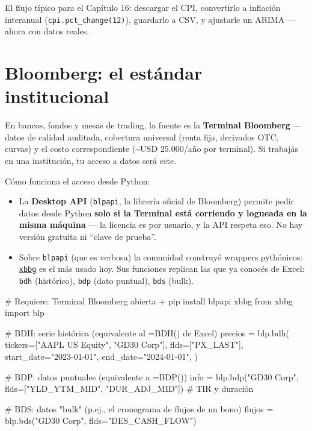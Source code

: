 \documentclass[
  spanish,
  letterpaper,
  DIV=11,
  numbers=noendperiod]{scrreprt}
\newenvironment{Shaded}{\begin{snugshade}}{\end{snugshade}}
\newcommand{\CommentTok}[1]{\textcolor[rgb]{0.37,0.37,0.37}{#1}}
\newcommand{\ImportTok}[1]{\textcolor[rgb]{0.00,0.46,0.62}{#1}}
\newcommand{\NormalTok}[1]{\textcolor[rgb]{0.00,0.23,0.31}{#1}}
\newcommand{\OperatorTok}[1]{\textcolor[rgb]{0.37,0.37,0.37}{#1}}
\newcommand{\StringTok}[1]{\textcolor[rgb]{0.13,0.47,0.30}{#1}}
\providecommand{\tightlist}{%
  \setlength{\itemsep}{0pt}\setlength{\parskip}{0pt}}
\begin{document}
El flujo típico para el Capítulo 16: descargar el CPI, convertirlo a
inflación interanual (\texttt{cpi.pct\_change(12)}), guardarlo a CSV, y
ajustarle un ARIMA --- ahora con datos reales.

\section{Bloomberg: el estándar
institucional}\label{bloomberg-el-estuxe1ndar-institucional}

En bancos, fondos y mesas de trading, la fuente es la \textbf{Terminal
Bloomberg} --- datos de calidad auditada, cobertura universal (renta
fija, derivados OTC, curvas) y el costo correspondiente
(\textasciitilde USD 25.000/año por terminal). Si trabajás en una
institución, tu acceso a datos será este.

Cómo funciona el acceso desde Python:

\begin{itemize}
\tightlist
\item
  La \textbf{Desktop API} (\texttt{blpapi}, la librería oficial de
  Bloomberg) permite pedir datos desde Python \textbf{solo si la
  Terminal está corriendo y logueada en la misma máquina} --- la
  licencia es por usuario, y la API respeta eso. No hay versión gratuita
  ni ``clave de prueba''.
\item
  Sobre \texttt{blpapi} (que es verbosa) la comunidad construyó wrappers
  pythónicos: \href{https://github.com/alpha-xone/xbbg}{\texttt{xbbg}}
  es el más usado hoy. Sus funciones replican las que ya conocés de
  Excel: \texttt{bdh} (histórico), \texttt{bdp} (dato puntual),
  \texttt{bds} (bulk).
\end{itemize}

\begin{Shaded}
\begin{Highlighting}[]
\CommentTok{\# Requiere: Terminal Bloomberg abierta + pip install blpapi xbbg}
\ImportTok{from}\NormalTok{ xbbg }\ImportTok{import}\NormalTok{ blp}

\CommentTok{\# BDH: serie histórica (equivalente al =BDH() de Excel)}
\NormalTok{precios }\OperatorTok{=}\NormalTok{ blp.bdh(}
\NormalTok{    tickers}\OperatorTok{=}\NormalTok{[}\StringTok{"AAPL US Equity"}\NormalTok{, }\StringTok{"GD30 Corp"}\NormalTok{],}
\NormalTok{    flds}\OperatorTok{=}\NormalTok{[}\StringTok{"PX\_LAST"}\NormalTok{],}
\NormalTok{    start\_date}\OperatorTok{=}\StringTok{"2023{-}01{-}01"}\NormalTok{,}
\NormalTok{    end\_date}\OperatorTok{=}\StringTok{"2024{-}01{-}01"}\NormalTok{,}
\NormalTok{)}

\CommentTok{\# BDP: datos puntuales (equivalente a =BDP())}
\NormalTok{info }\OperatorTok{=}\NormalTok{ blp.bdp(}\StringTok{"GD30 Corp"}\NormalTok{, flds}\OperatorTok{=}\NormalTok{[}\StringTok{"YLD\_YTM\_MID"}\NormalTok{, }\StringTok{"DUR\_ADJ\_MID"}\NormalTok{])  }\CommentTok{\# TIR y duración}

\CommentTok{\# BDS: datos "bulk" (p.ej., el cronograma de flujos de un bono)}
\NormalTok{flujos }\OperatorTok{=}\NormalTok{ blp.bds(}\StringTok{"GD30 Corp"}\NormalTok{, flds}\OperatorTok{=}\StringTok{"DES\_CASH\_FLOW"}\NormalTok{)}
\end{Highlighting}
\end{Shaded}
\end{document}
